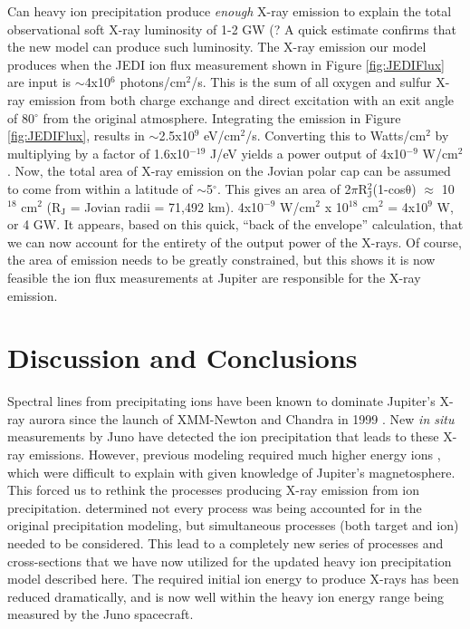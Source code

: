 \documentclass[draft]{agujournal2018}
\begin{document}
Can heavy ion precipitation produce \textit{enough} X-ray emission to explain the total observational soft X-ray luminosity of 1-2 GW (\citep{elsner2005,gladstone2002}?
A quick estimate confirms that the new model can produce such luminosity.
The X-ray emission our model produces when the JEDI ion flux measurement shown in Figure \ref{fig:JEDIFlux} are input is $\sim$4x10$^6$ photons/cm$^2$/s.
This is the sum of all oxygen and sulfur X-ray emission from both charge exchange and direct excitation with an exit angle of 80$^{\circ}$ from the original atmosphere.
Integrating the emission in Figure \ref{fig:JEDIFlux}, results in $\sim$2.5x10$^9$ eV/cm$^2$/s.
Converting this to Watts/cm$^2$ by multiplying by a factor of 1.6x10$^{-19}$ J/eV yields a power output of 4x10$^{-9}$ W/cm$^2$.
Now, the total area of X-ray emission on the Jovian polar cap can be assumed to come from within a latitude of $\sim$5$^{\circ}$.
This gives an area of 2$\pi$R$_{\mathrm{J}}^2$(1-cos$\mathrm{\theta}$) $\approx$ 10$^{18}$ cm$^2$ (R$_{\mathrm{J}}$ = Jovian radii = 71,492 km).
4x10$^{-9}$ W/cm$^2$ x 10$^{18}$ cm$^2$ = 4x10$^9$ W, or 4 GW.
It appears, based on this quick, ``back of the envelope'' calculation, that we can now account for the entirety of the output power of the X-rays.
Of course, the area of emission needs to be greatly constrained, but this shows it is now feasible the ion flux measurements at Jupiter are responsible for the X-ray emission.

\section{Discussion and Conclusions}

Spectral lines from precipitating ions have been known to dominate Jupiter's X-ray aurora since the launch of XMM-Newton and Chandra in 1999 \citep{branduardi2004,elsner2005}.
New \textit{in situ} measurements by Juno have detected the ion precipitation that leads to these X-ray emissions.
However, previous modeling required much higher energy ions \citep{cravens1995,ozak2010,ozak2013,houston2018}, which were difficult to explain with given knowledge of Jupiter's magnetosphere.
This forced us to rethink the processes producing X-ray emission from ion precipitation.
\citet{schultz2019} determined not every process was being accounted for in the original precipitation modeling, but simultaneous processes (both target and ion) needed to be considered.
This lead to a completely new series of processes and cross-sections that we have now utilized for the updated heavy ion precipitation model described here.
The required initial ion energy to produce X-rays has been reduced dramatically, and is now well within the heavy ion energy range being measured by the Juno spacecraft.
\end{document}
